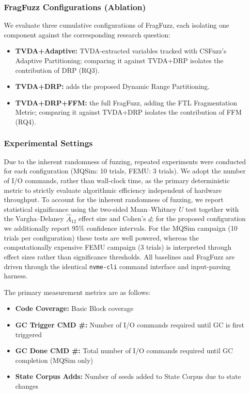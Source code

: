 \documentclass[conference]{IEEEtran}
\begin{document}
\subsubsection{FragFuzz Configurations (Ablation)}
We evaluate three cumulative configurations of FragFuzz, each isolating one component against the corresponding research question:
\begin{itemize}
\item \textbf{TVDA+Adaptive:} TVDA-extracted variables tracked with CSFuzz's Adaptive Partitioning; comparing it against TVDA+DRP isolates the contribution of DRP (RQ3).
\item \textbf{TVDA+DRP:} adds the proposed Dynamic Range Partitioning.
\item \textbf{TVDA+DRP+FFM:} the full FragFuzz, adding the FTL Fragmentation Metric; comparing it against TVDA+DRP isolates the contribution of FFM (RQ4).
\end{itemize}

\subsubsection{Experimental Settings}
Due to the inherent randomness of fuzzing, repeated experiments were conducted for each configuration (MQSim: 10 trials, FEMU: 3 trials).
We adopt the number of I/O commands, rather than wall-clock time, as the primary deterministic metric to strictly evaluate algorithmic efficiency independent of hardware throughput.
To account for the inherent randomness of fuzzing, we report statistical significance using the two-sided Mann--Whitney $U$ test together with the Vargha--Delaney $\hat{A}_{12}$ effect size and Cohen's $d$; for the proposed configuration we additionally report 95\% confidence intervals.
For the MQSim campaign (10 trials per configuration) these tests are well powered, whereas the computationally expensive FEMU campaign (3 trials) is interpreted through effect sizes rather than significance thresholds.
All baselines and FragFuzz are driven through the identical \texttt{nvme-cli} command interface and input-parsing harness.

The primary measurement metrics are as follows:

\begin{itemize}
\item \textbf{Code Coverage:} Basic Block coverage
\item \textbf{GC Trigger CMD \#:} Number of I/O commands required until GC is first triggered
\item \textbf{GC Done CMD \#:} Total number of I/O commands required until GC completion (MQSim only)
\item \textbf{State Corpus Adds:} Number of seeds added to State Corpus due to state changes
\end{itemize}
\end{document}
